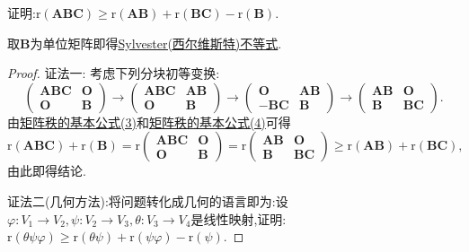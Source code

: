 \documentclass[../../main.tex]{subfiles}
\begin{document}
\begin{proposition}\label{proposition:Frobenius(弗罗贝尼乌斯)不等式}
证明:\(\mathrm{r}(\boldsymbol{A}\boldsymbol{B}\boldsymbol{C})\geqslant \mathrm{r}(\boldsymbol{A}\boldsymbol{B})+\mathrm{r}(\boldsymbol{B}\boldsymbol{C})-\mathrm{r}(\boldsymbol{B})\).
\end{proposition}
\begin{remark}
取$\boldsymbol{B}$为单位矩阵即得\hyperref[proposition:Sylvester(西尔维斯特)不等式]{Sylvester(西尔维斯特)不等式}.
\end{remark}
\begin{proof}
{\color{blue}证法一:}
考虑下列分块初等变换:
\[
\begin{pmatrix}
\boldsymbol{A}\boldsymbol{B}\boldsymbol{C}&\boldsymbol{O}\\
\boldsymbol{O}&\boldsymbol{B}
\end{pmatrix}\to
\begin{pmatrix}
\boldsymbol{A}\boldsymbol{B}\boldsymbol{C}&\boldsymbol{A}\boldsymbol{B}\\
\boldsymbol{O}&\boldsymbol{B}
\end{pmatrix}\to
\begin{pmatrix}
\boldsymbol{O}&\boldsymbol{A}\boldsymbol{B}\\
-\boldsymbol{B}\boldsymbol{C}&\boldsymbol{B}
\end{pmatrix}\to
\begin{pmatrix}
\boldsymbol{A}\boldsymbol{B}&\boldsymbol{O}\\
\boldsymbol{B}&\boldsymbol{B}\boldsymbol{C}
\end{pmatrix}.
\]
由\hyperref[矩阵秩的基本公式3]{矩阵秩的基本公式(3)}和\hyperref[矩阵秩的基本公式4]{矩阵秩的基本公式(4)}可得
\[
\mathrm{r}(\boldsymbol{A}\boldsymbol{B}\boldsymbol{C})+\mathrm{r}(\boldsymbol{B})=\mathrm{r}\begin{pmatrix}
\boldsymbol{A}\boldsymbol{B}\boldsymbol{C}&\boldsymbol{O}\\
\boldsymbol{O}&\boldsymbol{B}
\end{pmatrix}=\mathrm{r}\begin{pmatrix}
\boldsymbol{A}\boldsymbol{B}&\boldsymbol{O}\\
\boldsymbol{B}&\boldsymbol{B}\boldsymbol{C}
\end{pmatrix}\geqslant \mathrm{r}(\boldsymbol{A}\boldsymbol{B})+\mathrm{r}(\boldsymbol{B}\boldsymbol{C}),
\]
由此即得结论. 

{\color{blue}证法二(几何方法):}将问题转化成几何的语言即为:设\(\varphi:V_1\to V_2,\psi:V_2\to V_3,\theta:V_3\to V_4\)是线性映射,证明:\(\text{r}(\theta\psi\varphi)\geqslant \text{r}(\theta\psi)+\text{r}(\psi\varphi)-\text{r}(\psi)\).


\end{proof}
\end{document}
